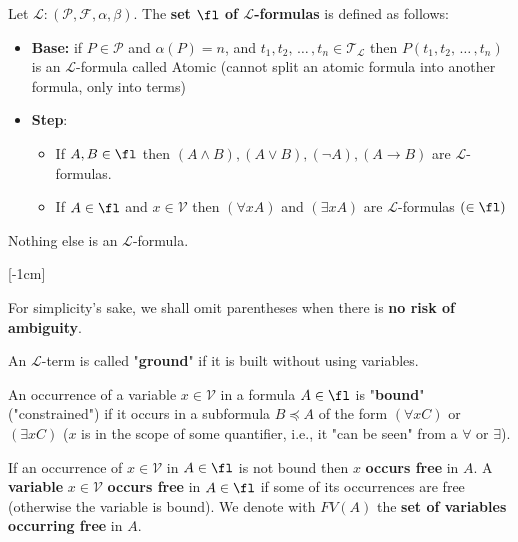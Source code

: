 \begin{definition}
	Let $\mathcal{L}: (\mathcal{P}, \mathcal{F}, \alpha, \beta)$. The \textbf{set $\fl$ of $\mathcal{L}$-formulas} is defined as follows:
	\begin{itemize}
		\item \textbf{Base:} if $P \in \mathcal{P}$ and $\alpha(P) = n$, and $t_1, t_2, \, \dots \, , t_n \in \mathcal{T}_{\mathcal{L}}$ then $P(t_1, t_2, \, \dots \, , t_n)$ is an $\mathcal{L}$-formula called Atomic (cannot split an atomic formula into another formula, only into terms)
		\item \textbf{Step}:
		\begin{itemize}
			\item If $A,B \in \fl$ then $(A \wedge B), (A \vee B), (\neg A), (A \rightarrow B)$ are $\mathcal{L}$-formulas.
			\item If $A \in \fl$ and $x \in \mathcal{V}$ then $(\forall x A)$ and $(\exists x A)$ are $\mathcal{L}$-formulas $(\in \fl)$
		\end{itemize}
	\end{itemize}
	Nothing else is an $\mathcal{L}$-formula.\\
\end{definition}

[-1cm]

\vspace{-0.6cm}

\begin{remark}
	For simplicity's sake, we shall omit parentheses when there is \textbf{no risk of ambiguity}.
\end{remark}

\begin{terminology}
	An $\mathcal{L}$-term is called "\textbf{ground}" if it is built without using variables.
\end{terminology}

\begin{terminology}
	An occurrence of a variable $x \in \mathcal{V}$ in a formula $A \in \fl$ is "\textbf{bound}" ("constrained") if it occurs in a subformula $B \preceq A$ of the form $(\forall x C)$ or $(\exists x C)$ ($x$ is in the scope of some quantifier, i.e., it "can be seen" from a $\forall$ or $\exists$).
\end{terminology}

\begin{terminology}
	If an occurrence of $x \in \mathcal{V}$ in $A \in \fl$ is not bound then $x$ \textbf{occurs free} in $A$. A \textbf{variable} $x \in \mathcal{V}$ \textbf{occurs free} in $A \in \fl$ if some of its occurrences are free (otherwise the variable is bound). We denote with $FV(A)$ the \textbf{set of variables occurring free} in $A$. 
\end{terminology}

